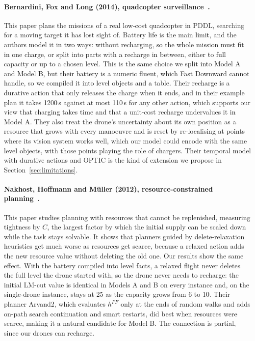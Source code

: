 \documentclass[11pt,a4paper]{article}
\newcommand{\p}[1]{\texttt{\detokenize{#1}}}
\begin{document}
\paragraph{Bernardini, Fox and Long (2014), quadcopter
surveillance~\cite{bernardini2014quadcopter}.}
This paper plans the missions of a real low-cost quadcopter in PDDL, searching
for a moving target it has lost sight of. Battery life is the main limit, and
the authors model it in two ways: without recharging, so the whole mission
must fit in one charge, or split into parts with a recharge in between,
either to full capacity or up to a chosen level. This is the same choice we
split into Model A and Model B, but their battery is a numeric fluent, which
Fast Downward cannot handle, so we compiled it into level objects and a
\p{battery_after} table. Their recharge is a durative action that only
releases the charge when it ends, and in their example plan it takes
1200\,s against at most 110\,s for any other action, which supports our view
that charging takes time and that a unit-cost recharge undervalues it in
Model A. They also treat the drone's uncertainty about its own position as a
resource that grows with every manoeuvre and is reset by re-localising at
points where its vision system works well, which our model could encode with
the same level objects, with those points playing the role of chargers.
Their temporal model with durative actions and OPTIC is the kind of
extension we propose in Section~\ref{sec:limitations}.

\paragraph{Nakhost, Hoffmann and M\"uller (2012), resource-constrained
planning~\cite{nakhost2012rcp}.}
This paper studies planning with resources that cannot be replenished,
measuring tightness by $C$, the largest factor by which the initial supply can
be scaled down while the task stays solvable. It shows that planners guided by
delete-relaxation heuristics get much worse as resources get scarce, because a
relaxed action adds the new resource value without deleting the old one.
Our results show the same effect. With the battery compiled into level facts,
a relaxed flight never deletes the full level the drone started with, so the
drone never needs to recharge: the initial LM-cut value is identical in
Models A and B on every instance and, on the single-drone instance, stays at
25 as the capacity grows from 6 to 10. Their planner Arvand2, which evaluates
$h^{FF}$ only at the ends of random walks and adds on-path search
continuation and smart restarts, did best when resources were scarce, making
it a natural candidate for Model B. The connection is partial, since our
drones can recharge.
\end{document}
